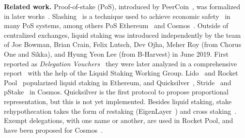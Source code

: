\noindent
\textbf{Related work.}
Proof-of-stake (PoS), introduced by PeerCoin~\cite{peercoin}, was formalized
in later works~\cite{ouroboros,praos,ouroboros-genesis,algorand,DBLP:journals/iacr/BentovPS16a}.
Slashing~\cite{slashing} is a technique used to achieve economic safety~\cite{slashable-safety}
in many PoS systems, among others
PoS Ethereum~\cite{casper,buterin2020combining}
and Cosmos~\cite{2018tendermint,buchman2016tendermint,cosmossdk}.
Outside of centralized exchanges, liquid staking was introduced independently by
the team of Joe Bowman, Brian Crain, Felix Lutsch, Dev Ojha, Meher Roy (from Chorus One and Sikka),
and Hyung Yeon Lee (from B-Harvest) in June 2019.
First reported as \emph{Delegation Vouchers}~\cite{delegation-vouchers}
they were later analyzed in a comprehensive report~\cite{liquid-staking-report} with
the help of the Liquid Staking Working Group.
Lido~\cite{lido} and Rocket Pool~\cite{rocket-pool} popularized liquid staking
in Ethereum, and Quicksilver~\cite{quicksilver}, Stride~\cite{stride} and
pStake~\cite{pstake} in Cosmos. Quicksilver is the first protocol to propose proportional
representation, but this is not yet implemented.
Besides liquid staking, stake rehypothecation takes the form of
restaking (EigenLayer~\cite{eigenlayer}) and cross staking~\cite{mesh-security}.
Exempt delegations, with one name or another, are used in Rocket Pool,
and have been proposed for Cosmos~\cite{adr-liquid-staking}.
